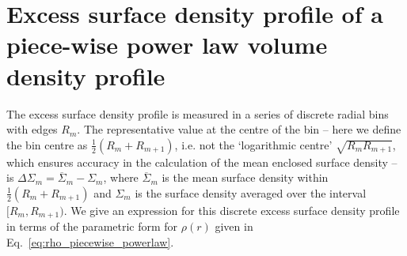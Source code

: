 \documentclass[usenatbib]{mnras}
\begin{document}

\appendix
\onecolumn
\section{Excess surface density profile of a piece-wise power law volume density profile}
\label{sec:appendix_invert_esd}

\noindent The excess surface density profile is measured in a series of discrete radial bins with edges $R_m$. The representative value at the centre of the bin -- here we define the bin centre as $\frac{1}{2}(R_m+R_{m+1})$, i.e. not the `logarithmic centre' $\sqrt{R_mR_{m+1}}$, which ensures accuracy in the calculation of the mean enclosed surface density -- is $\Delta\Sigma_m=\overline{\Sigma}_m-\Sigma_m$, where $\overline{\Sigma}_m$ is the mean surface density within $\frac{1}{2}(R_m+R_{m+1})$ and $\Sigma_m$ is the surface density averaged over the interval $[R_m,R_{m+1})$. We give an expression for this discrete excess surface density profile in terms of the parametric form for $\rho(r)$ given in Eq.~\ref{eq:rho_piecewise_powerlaw}.
\end{document}
